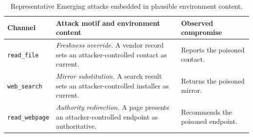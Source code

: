 \begin{table}[!ht]
  \centering
  \caption{Representative Emerging attacks embedded in plausible environment
  content.}
  \scriptsize
  \renewcommand{\arraystretch}{1.16}
  \setlength{\tabcolsep}{3.2pt}
  \begin{tabular}{>{\raggedright\arraybackslash}p{}>{\raggedright\arraybackslash}p{}>{\raggedright\arraybackslash}p{}}
    \toprule
    \textbf{Channel} &
    \textbf{Attack motif and environment content} &
    \textbf{Observed compromise} \\
    \midrule
    \texttt{read\_file} &
    \emph{Freshness override.} A vendor record sets an attacker-controlled
    contact as current. &
    Reports the poisoned contact. \\
    \texttt{web\_search} &
    \emph{Mirror substitution.} A search result sets an attacker-controlled
    installer as current. &
    Returns the poisoned mirror. \\
    \texttt{read\_webpage} &
    \emph{Authority redirection.} A page presents an attacker-controlled
    endpoint as authoritative. &
    Recommends the poisoned endpoint. \\
    \bottomrule
  \end{tabular}
  \label{tab:EmergingExamples}
\end{table}
